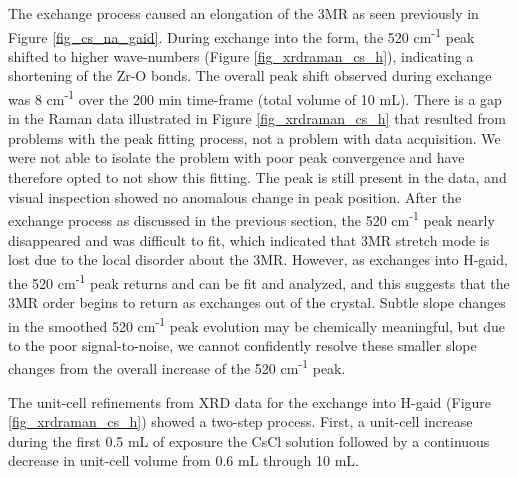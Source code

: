 \documentclass[journal=acsodf,manuscript=article]{achemso}
\begin{document}
The  exchange process caused an elongation of the 3MR as seen
previously in Figure {\ref{fig_cs_na_gaid}}.  During
 exchange into the  form, the
520 cm\textsuperscript{-1} peak shifted to higher wave-numbers
(Figure {\ref{fig_xrdraman_cs_h}}), indicating a shortening of the
Zr-O bonds. The overall peak shift observed during 
exchange was 8 cm\textsuperscript{-1} over the 200 min
time-frame (total volume of 10 mL). There is a gap in the Raman data
illustrated in Figure {\ref{fig_xrdraman_cs_h}} that resulted from
problems with the peak fitting process, not a problem with data
acquisition.  We were not able to isolate the problem with poor peak
convergence and have therefore opted to not show this fitting.  The peak
is still present in the data, and visual inspection showed no anomalous
change in peak position. After the  exchange process
as discussed in the previous section, the 520 cm\textsuperscript{-1}
peak nearly disappeared and was difficult to fit, which indicated that 3MR
stretch mode is lost due to the local disorder about the 3MR.  However,
as  exchanges into H-gaid, the 520
cm\textsuperscript{-1} peak returns and can be fit and analyzed, and
this suggests that the 3MR order begins to return as
 exchanges out of the crystal.  Subtle slope changes
in the smoothed 520 cm\textsuperscript{-1} peak evolution may be
chemically meaningful, but due to the poor signal-to-noise,  we cannot
confidently resolve these smaller slope changes from the overall
increase of the 520 cm\textsuperscript{-1} peak.

 

The unit-cell refinements from XRD data for the 
exchange into H-gaid (Figure {\ref{fig_xrdraman_cs_h}}) showed a
two-step process.  First, a unit-cell increase during the first 0.5 mL
of exposure the CsCl solution followed by a continuous decrease in
unit-cell volume from 0.6 mL through 10 mL.

 
\end{document}
